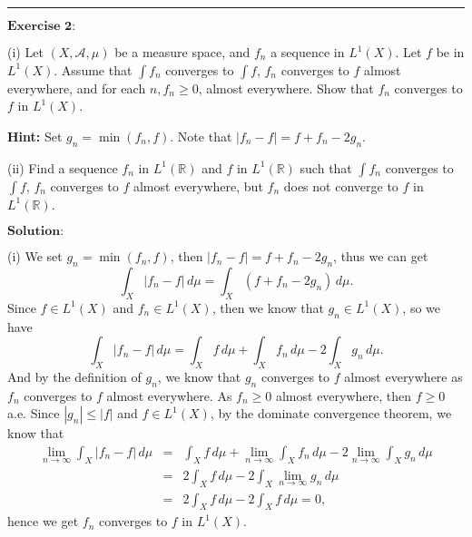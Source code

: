 \documentclass[12pt,a4paper]{ctexart}
\begin{document}
\noindent\rule[0.25\baselineskip]{\textwidth}{0.5pt}

\vspace{8pt}

$\textbf{Exercise 2:}$

(i) Let $(X, \mathcal{A}, \mu)$ be a measure space, and $f_{n}$ a sequence in $L^{1}(X)$. Let $f$ be in $L^{1}(X)$. Assume that $\int f_{n}$ converges to $\int f$, $f_{n}$ converges to $f$ almost everywhere, and for each $n, f_{n} \geq 0$, almost everywhere. Show that $f_{n}$ converges to $f$ in $L^{1}(X)$.

\textbf{Hint:} Set $g_{n} = \min(f_{n}, f)$. Note that $|f_{n} - f| = f + f_{n} - 2 g_{n}$.

(ii) Find a sequence $f_{n}$ in $L^{1}(\mathbb{R})$ and $f$ in $L^{1}(\mathbb{R})$ such that $\int f_{n}$ converges to $\int f$, $f_{n}$ converges to $f$ almost everywhere, but $f_{n}$ does not converge to $f$ in $L^{1}(\mathbb{R})$.
 
\vspace{8pt}
$\textbf{Solution:}$

(i) We set $g_{n} = \min(f_{n}, f)$, then $|f_{n} - f| = f + f_{n} - 2 g_{n}$, thus we can get
\begin{equation*}
    \int_{X}^{} |f_{n} - f| \, d \mu = \int_{X}^{} (f + f_{n} - 2 g_{n}) \, d \mu.
\end{equation*}
Since $f \in L^{1}(X)$ and $f_{n} \in L^{1}(X)$, then we know that $g_{n} \in L^{1}(X)$, so we have
\begin{equation*}
    \int_{X}^{} |f_{n} - f| \, d \mu = \int_{X}^{} f \, d \mu + \int_{X}^{} f_{n} \, d \mu - 2 \int_{X}^{} g_{n} \, d \mu.
\end{equation*}
And by the definition of $g_{n}$, we know that $g_{n}$ converges to $f$ almost everywhere as $f_{n}$ converges to $f$ almost everywhere. As $f_{n} \geq 0$ almost everywhere, then $f \geq 0$ a.e. Since $|g_{n}| \leq |f|$ and $f \in L^{1} (X)$, by the dominate convergence theorem, we know that
\begin{eqnarray*}
    \lim_{n \to \infty} \int_{X}^{} |f_{n} - f| \, d \mu & = & \int_{X}^{} f \, d \mu + \lim_{n \to \infty}  \int_{X}^{} f_{n} \, d \mu - 2 \lim_{n \to \infty} \int_{X}^{} g_{n} \, d \mu \\
    & = & 2 \int_{X}^{} f \, d \mu - 2 \int_{X}^{} \lim_{n \to \infty} g_{n} \, d \mu \\
    & = & 2 \int_{X}^{} f \, d \mu - 2 \int_{X}^{} f \, d \mu = 0,
\end{eqnarray*}
hence we get $f_{n}$ converges to $f$ in $L^{1}(X)$.
\end{document}

